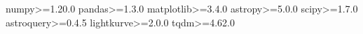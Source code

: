 numpy>=1.20.0
pandas>=1.3.0
matplotlib>=3.4.0
astropy>=5.0.0
scipy>=1.7.0
astroquery>=0.4.5
lightkurve>=2.0.0
tqdm>=4.62.0
